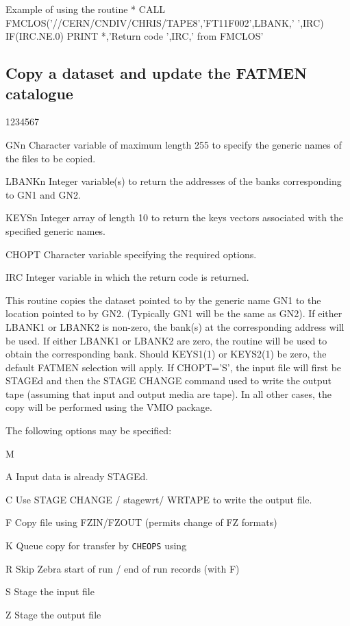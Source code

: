 \begin{XMPt}{Example of using the routine  }
*
      CALL FMCLOS('//CERN/CNDIV/CHRIS/TAPE8','FT11F002',LBANK,' ',IRC)
      IF(IRC.NE.0) PRINT *,'Return code ',IRC,' from FMCLOS'
\end{XMPt}
\subsection{Copy a dataset and update the FATMEN catalogue}
\begin{DLtt}{1234567}
\item[GNn]
Character variable of maximum length 255 to specify the generic names
of the files to be copied.
\item[LBANKn]
Integer variable(s) to return the addresses of the banks
corresponding to GN1 and GN2.
\item[KEYSn]
Integer array of length 10 to return the keys vectors associated
with the specified generic names.
\item[CHOPT]
Character variable specifying the required options.
\item[IRC]
Integer variable in which the return code is returned.
\end{DLtt}
\par
This routine copies the dataset pointed to by the generic
name GN1 to the location pointed to by GN2.
(Typically GN1 will be the same as GN2).
If either LBANK1 or LBANK2 is non-zero,
the bank(s) at the corresponding address will be used.
If either LBANK1 or LBANK2 are zero, the routine  will
be used to obtain the corresponding bank. Should KEYS1(1) or KEYS2(1)
be zero, the default FATMEN selection will apply.
If CHOPT='S', the input file will first be STAGEd and then the
STAGE CHANGE command used to write the output tape (assuming
that input and output media are tape). In all other cases,
the copy will be performed using the VMIO package.
\par
The following options may be specified:
\begin{DL}{M}
\item[A]Input data is already STAGEd.
\item[C]Use STAGE CHANGE / stagewrt/ WRTAPE to write the output file.
\item[F]Copy file using FZIN/FZOUT (permits change of FZ formats)
\item[K]Queue copy for transfer by {\tt CHEOPS} using 
\item[R]Skip Zebra start of run / end of run records (with F)
\item[S]Stage the input file
\item[Z]Stage the output file
\end{DL}
